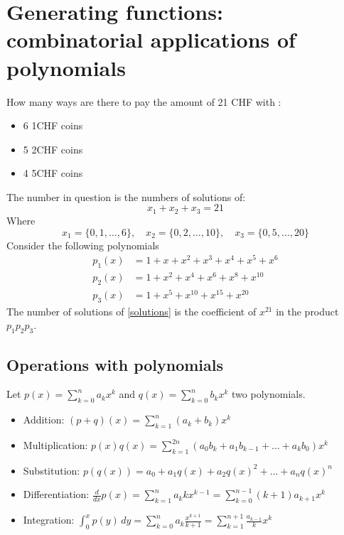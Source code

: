 
\section{Generating functions: combinatorial applications of polynomials}

\begin{example}
How  many ways are there to pay the amount of 21 CHF with :
\begin{itemize}
\item 6 1CHF coins
\item 5 2CHF coins
\item 4 5CHF coins
\end{itemize}

The number in question is the numbers of solutions of:
\begin{equation}
x_{1}+x_{2}+x_{3}=21 \label{solutions}
\end{equation}
Where
$$
x_{1}=\{ 0,1,\dots,6 \},\quad x_{2}=\{ 0,2,\dots,10 \},\quad x_{3}=\{ 0,5,\dots,20 \}
$$
Consider the following polynomials
\begin{align*}
p_{1}(x) & =1+x+x^{2}+x^{3}+x^{4}+x^{5}+x^{6 } \\
p_{2}(x) & =1+x^{2}+x^{4}+x^{6}+x^{8} +x^{10}\\
p_{3}(x) & =1+x^{5}+x^{10}+x^{15}+x^{20}
\end{align*}
The number of solutions of \ref{solutions} is the coefficient of $x^{21}$ in the product $p_{1}p_{2}p_{3}$.
\end{example}

\subsection*{Operations with polynomials}

Let $p(x)=\sum_{k=0}^{n}a_{k}x^{k}$ and $q(x)=\sum_{k=0}^{n}b_{k}x^{k}$ two polynomials.
\begin{itemize}
\item Addition: $(p+q)(x)=\sum_{k=1}^{n}(a_{k}+b_{k})x^{k}$
\item Multiplication: $p(x)q(x)=\sum_{k=1}^{2n}(a_{0}b_{k}+a_{1}b_{k-1}+\dots +a_{k}b_{0})x^{k}$
\item Substitution: $p(q(x))=a_{0}+a_{1}q(x)+a_{2}q(x)^{2}+\dots +a_{n}q(x)^{n}$
\item Differentiation: $\frac{d}{dx}p(x)=\sum_{k=1}^{n}a_{k}kx^{k-1}=\sum_{k=0}^{n-1}(k+1)a_{k+1}x^{k}$
\item Integration: $\int_{0}^{x} p(y)  \, dy=\sum_{k=0}^{n}a_{k} \frac{x^{k+1}}{k+1}=\sum_{k=1}^{n+1} \frac{a_{k-1}}{k}x^{k}$
\end{itemize}

